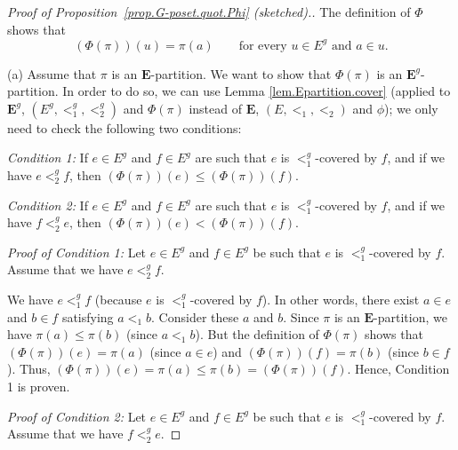 \documentclass[12pt]{article}
\theoremstyle{plain}
\theoremstyle{definition}
\theoremstyle{remark}
\newcommand{\EE}{{\mathbf{E}}}
\begin{document}
\begin{proof}[Proof of Proposition~\ref{prop.G-poset.quot.Phi} (sketched).]
The definition of $\Phi$ shows that
\begin{equation}
\left(\Phi\left(\pi\right)\right) \left( u \right)
= \pi\left( a \right)
\qquad\text{for every } u \in E^{g} \text{ and } a \in u.
\label{pf.prop.G-poset.quot.phi.main}
\end{equation}

(a) Assume that $\pi$ is an $\EE$-partition. We
want to show that $\Phi\left(  \pi\right)  $ is an
$ \EE ^{g}$-partition. In order to do so, we can
use Lemma \ref{lem.Epartition.cover}
(applied to $\EE^{g}$, $\left(  E^{g},<_{1}^{g},<_{2}^{g}\right)  $ and
$\Phi\left(  \pi\right)  $ instead of $\EE$,
$\left(  E,<_{1},<_{2}\right)  $ and $\phi$); we only need to
check the following two conditions:

\textit{Condition 1:} If $e\in E^{g}$ and $f\in E^{g}$ are such that $e$ is
$<_{1}^{g}$-covered by $f$, and if we have $e<_{2}^{g}f$, then $\left(
\Phi\left(  \pi\right)  \right)  \left(  e\right)  \leq\left(  \Phi\left(
\pi\right)  \right)  \left(  f\right)  $.

\textit{Condition 2:} If $e\in E^{g}$ and $f\in E^{g}$ are such that $e$ is
$<_{1}^{g}$-covered by $f$, and if we have $f<_{2}^{g}e$, then $\left(
\Phi\left(  \pi\right)  \right)  \left(  e\right)  <\left(  \Phi\left(
\pi\right)  \right)  \left(  f\right)  $.

\textit{Proof of Condition 1:} Let $e\in E^{g}$ and $f\in E^{g}$ be such that
$e$ is $<_{1}^{g}$-covered by $f$. Assume that we have $e<_{2}^{g}f$.

We have $e<_{1}^{g}f$ (because $e$ is $<_{1}^{g}$-covered by $f$). In other
words, there exist $a\in e$ and $b\in f$ satisfying $a<_{1}b$. Consider these
$a$ and $b$. Since $\pi$ is an $\EE$-partition, we have $\pi\left(
a\right)  \leq\pi\left(  b\right)  $ (since $a<_{1}b$). But the definition of
$\Phi\left(  \pi\right)  $ shows that $\left(  \Phi\left(  \pi\right)
\right)  \left(  e\right)  =\pi\left(  a\right)  $ (since $a\in e$) and
$\left(  \Phi\left(  \pi\right)  \right)  \left(  f\right)  =\pi\left(
b\right)  $ (since $b\in f$). Thus, $\left(  \Phi\left(  \pi\right)  \right)
\left(  e\right)  =\pi\left(  a\right)  \leq\pi\left(  b\right)  =\left(
\Phi\left(  \pi\right)  \right)  \left(  f\right)  $. Hence, Condition 1 is proven.

\textit{Proof of Condition 2:} Let $e\in E^{g}$ and $f\in E^{g}$ be such that
$e$ is $<_{1}^{g}$-covered by $f$. Assume that we have $f<_{2}^{g}e$.


\end{proof}
\end{document}
